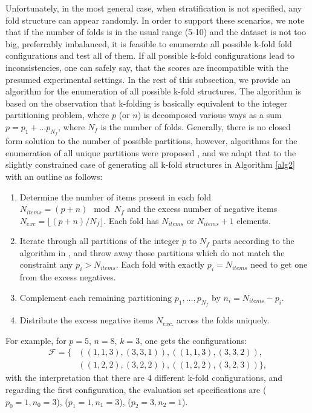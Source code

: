 \documentclass[5p, final]{elsarticle}
\begin{document}
Unfortunately, in the most general case, when stratification is not specified, any fold structure can appear randomly. In order to support these scenarios, we note that if the number of folds is in the usual range (5-10) and the dataset is not too big, preferrably imbalanced, it is feasible to enumerate all possible k-fold fold configurations and test all of them. If all possible k-fold configurations lead to inconsistencies, one can safely say, that the scores are incompatible with the presumed experimental settings. In the rest of this subsection, we provide an algorithm for the enumeration of all possible k-fold structures. The algorithm is based on the observation that k-folding is basically equivalent to the integer partitioning problem, where $p$ (or $n$) is decomposed various ways as a sum $p=p_1 + \dots p_{N_f}$, where $N_f$ is the number of folds. Generally, there is no closed form solution to the number of possible partitions, however, algorithms for the enumeration of all unique partitions were proposed \cite{intpart}, and we adapt that to the slightly constrained case of generating all k-fold structures in Algorithm \ref{alg2} with an outline as follows:
\begin{enumerate}
\item Determine the number of items present in each fold $N_{items} = (p + n) \mod N_{f}$ and the excess number of negative items $N_{exc} = \lfloor(p + n) / N_{f}\rfloor$. Each fold has $N_{items}$ or $N_{items}+1$ elements.
\item Iterate through all partitions of the integer $p$ to $N_f$ parts according to the algorithm in \cite{intpart}, and throw away those partitions which do not match the constraint any $p_i > N_{items}$. Each fold with exactly $p_i = N_{items}$ need to get one from the excess negatives.
\item Complement each remaining partitioning $p_1, \dots, p_{N_f}$ by $n_i = N_{items} - p_i$.
\item Distribute the excess negative items $N_{exc.}$ across the folds uniquely.
\end{enumerate}
For example, for $p=5$, $n=8$, $k=3$, one gets the configurations:
\begin{align}
\mathcal{F} = \lbrace 
& ((1, 1, 3), (3, 3, 1)),
 ((1, 1, 3), (3, 3, 2)),\nonumber\\
& ((1, 2, 2), (3, 2, 2)),
 ((1, 2, 2), (3, 2, 3))\rbrace\nonumber,
\end{align}
with the interpretation that there are 4 different k-fold configurations, and regarding the first configuration, the evaluation set specifications are ($p_0=1, n_0=3$), ($p_1=1, n_1=3$), ($p_2=3, n_2=1$).
\end{document}
